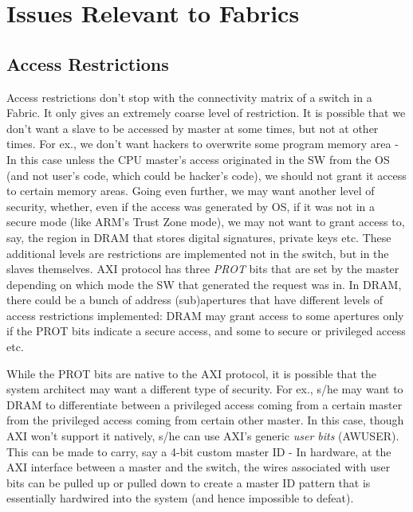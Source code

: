 \section{Issues Relevant to Fabrics}
\subsection{Access Restrictions}
Access restrictions don't stop with the connectivity matrix of a switch in a Fabric. It only gives an extremely coarse level of restriction. It is possible that we don't want a slave to be accessed by master at some times, but not at other times. For ex., we don't want hackers to overwrite some program memory area - In this case unless the CPU master's access originated in the SW from the OS (and not user's code, which could be hacker's code), we should not grant it access to certain memory areas. Going even further, we may want another level of security, whether, even if the access was generated by OS, if it was not in a secure mode (like ARM's Trust Zone mode), we may not want to grant access to, say, the region in DRAM that stores digital signatures, private keys etc. These additional levels are restrictions are implemented not in the switch, but in the slaves themselves. AXI protocol has three \emph{PROT} bits that are set by the master depending on which mode the SW that generated the request was in. In DRAM, there could be a bunch of address (sub)apertures that have different levels of access restrictions implemented: DRAM may grant access to some apertures only if the PROT bits indicate a secure access, and some to secure or privileged access etc.

While the PROT bits are native to the AXI protocol, it is possible that the system architect may want a different type of security. For ex., s/he may want to DRAM to differentiate between a privileged access coming from a certain master from the privileged access coming from certain other master. In this case, though AXI won't support it natively, s/he can use AXI's generic \emph{user bits} (AWUSER). This can be made to carry, say a 4-bit custom master ID - In hardware, at the AXI interface between a master and the switch, the wires associated with user bits can be pulled up or pulled down to create a master ID pattern that is essentially hardwired into the system (and hence impossible to defeat).

